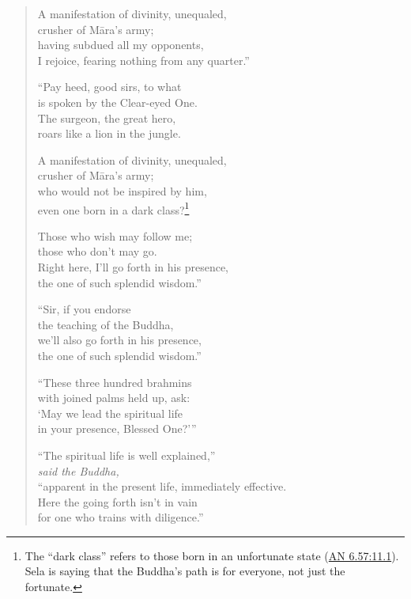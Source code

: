\documentclass[12pt,openany]{book}%
\newcommand*{\scspeaker}[1]{\hspace{2em}\textit{#1}}
\begin{document}
\begin{verse}
A manifestation of divinity, unequaled, \\
crusher of \textsanskrit{Māra}’s army; \\
having subdued all my opponents, \\
I rejoice, fearing nothing from any quarter.” 

“Pay heed, good sirs, to what \\
is spoken by the Clear-eyed One. \\
The surgeon, the great hero, \\
roars like a lion in the jungle. 

A manifestation of divinity, unequaled, \\
crusher of \textsanskrit{Māra}’s army; \\
who would not be inspired by him, \\
even one born in a dark class?\footnote{The “dark class” refers to those born in an unfortunate state (\href{https://suttacentral.net/an6.57/en/sujato\#11.1}{AN 6.57:11.1}). Sela is saying that the Buddha’s path is for everyone, not just the fortunate. } 

Those who wish may follow me; \\
those who don’t may go. \\
Right here, I’ll go forth in his presence, \\
the one of such splendid wisdom.” 

“Sir, if you endorse \\
the teaching of the Buddha, \\
we’ll also go forth in his presence, \\
the one of such splendid wisdom.” 

“These three hundred brahmins \\
with joined palms held up, ask: \\
‘May we lead the spiritual life \\
in your presence, Blessed One?’” 

“The spiritual life is well explained,” \\
\scspeaker{said the Buddha, }\\
“apparent in the present life, immediately effective. \\
Here the going forth isn’t in vain \\
for one who trains with diligence.” 

%
\end{verse}
\end{document}
